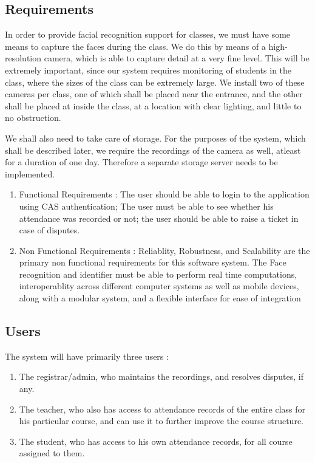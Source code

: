 \documentclass[conference]{IEEEtran}
\begin{document}
\subsection[]{Requirements}
In order to provide facial recognition support for classes, we must have some means to capture the faces during the class. We do this by means of a high-resolution camera, which is able to capture detail at a very fine level. 
This will be extremely important, since our system requires monitoring of students in the class, where the sizes of the class can be extremely large.
We install two of these cameras per class, one of which shall be placed near the entrance, and the other shall be placed at inside the class, at a location with clear lighting, and little to no obstruction.
\par
We shall also need to take care of storage. For the purposes of the system, which shall be described later, we require the recordings of the camera as well, atleast for a duration of one day. Therefore a separate storage server needs to be implemented.
\begin{enumerate}
    \item Functional Requirements : The user should be able to login to the application using CAS authentication; The user must be able to see whether his attendance was recorded or not; the user should be able to raise a ticket in case of disputes.
    \item Non Functional Requirements : Reliablity, Robustness, and Scalability are the primary non functional requirements for this software system. The Face recognition and identifier must be able to perform real time computations, interoperablity across different computer systems as well as mobile devices, along with a modular system, and a flexible interface for ease of integration
\end{enumerate}
\subsection[]{Users}
The system will have primarily three users :
\begin{enumerate}
    \item The registrar/admin, who maintains the recordings, and resolves disputes, if any.
    \item The teacher, who also has access to attendance records of the entire class for his particular course, and can use it to further improve the course structure.
    \item The student, who has access to his own attendance records, for all course assigned to them.
\end{enumerate}
\end{document}
